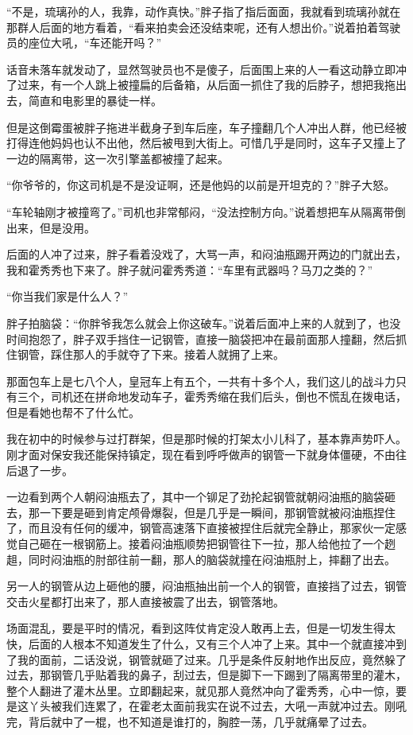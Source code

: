 “不是，琉璃孙的人，我靠，动作真快。”胖子指了指后面面，我就看到琉璃孙就在那群人后面的地方看着，“看来拍卖会还没结束呢，还有人想出价。”说着拍着驾驶员的座位大吼，“车还能开吗？”

话音未落车就发动了，显然驾驶员也不是傻子，后面围上来的人一看这动静立即冲了过来，有一个人跳上被撞扁的后备箱，从后面一抓住了我的后脖子，想把我拖出去，简直和电影里的暴徒一样。

但是这倒霉蛋被胖子拖进半截身子到车后座，车子撞翻几个人冲出人群，他已经被打得连他妈妈也认不出他，然后被甩到大街上。可惜几乎是同时，这车子又撞上了一边的隔离带，这一次引擎盖都被撞了起来。

“你爷爷的，你这司机是不是没证啊，还是他妈的以前是开坦克的？”胖子大怒。

“车轮轴刚才被撞弯了。”司机也非常郁闷，“没法控制方向。”说着想把车从隔离带倒出来，但是没用。

后面的人冲了过来，胖子看着没戏了，大骂一声，和闷油瓶踢开两边的门就出去，我和霍秀秀也下来了。胖子就问霍秀秀道：“车里有武器吗？马刀之类的？”

“你当我们家是什么人？”

胖子拍脑袋：“你胖爷我怎么就会上你这破车。”说着后面冲上来的人就到了，也没时间抱怨了，胖子双手挡住一记钢管，直接一脑袋把冲在最前面那人撞翻，然后抓住钢管，踩住那人的手就夺了下来。接着人就拥了上来。

那面包车上是七八个人，皇冠车上有五个，一共有十多个人，我们这儿的战斗力只有三个，司机还在拼命地发动车子，霍秀秀缩在我们后头，倒也不慌乱在拨电话，但是看她也帮不了什么忙。

我在初中的时候参与过打群架，但是那时候的打架太小儿科了，基本靠声势吓人。刚才面对保安我还能保持镇定，现在看到呼呼做声的钢管一下就身体僵硬，不由往后退了一步。

一边看到两个人朝闷油瓶去了，其中一个铆足了劲抡起钢管就朝闷油瓶的脑袋砸去，那一下要是砸到肯定颅骨爆裂，但是几乎是一瞬间，那钢管就被闷油瓶捏住了，而且没有任何的缓冲，钢管高速落下直接被捏住后就完全静止，那家伙一定感觉自己砸在一根钢筋上。接着闷油瓶顺势把钢管往下一拉，那人给他拉了一个趔趄，同时闷油瓶的肘部往前一翻，那人的脑袋就撞在闷油瓶肘上，摔翻了出去。

另一人的钢管从边上砸他的腰，闷油瓶抽出前一个人的钢管，直接挡了过去，钢管交击火星都打出来了，那人直接被震了出去，钢管落地。

场面混乱，要是平时的情况，看到这阵仗肯定没人敢再上去，但是一切发生得太快，后面的人根本不知道发生了什么，又有三个人冲了上来。其中一个就直接冲到了我的面前，二话没说，钢管就砸了过来。几乎是条件反射地作出反应，竟然躲了过去，那钢管几乎贴着我的鼻子，刮过去，但是脚下一下踢到了隔离带里的灌木，整个人翻进了灌木丛里。立即翻起来，就见那人竟然冲向了霍秀秀，心中一惊，要是这丫头被我们连累了，在霍老太面前我实在说不过去，大吼一声就冲过去。刚吼完，背后就中了一棍，也不知道是谁打的，胸腔一荡，几乎就痛晕了过去。

